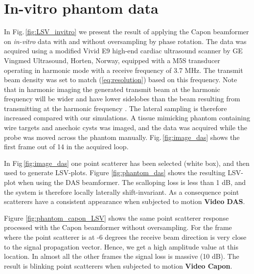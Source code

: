 \documentclass[journal]{IEEEtran}
\newcommand\multimedia[1]{\textbf{{\color{red}#1}}}
\begin{document}
\section{In-vitro phantom data}\label{sec:res}
In Fig.\,\ref{fig:LSV_invitro} we present the result of applying the Capon beamformer on \textit{in-vitro} data with and without oversampling by phase rotation. The data was acquired using a modified Vivid E9 high-end cardiac ultrasound scanner by GE Vingmed Ultrasound, Horten, Norway, equipped with a M5S transducer operating in harmonic mode with a receive frequency of 3.7 MHz. The transmit beam density was set to match (\ref{eq:resolution}) based on this frequency. Note that in harmonic imaging the generated transmit beam at the harmonic frequency will be wider and have lower sidelobes than the beam resulting from transmitting at the harmonic frequency \cite{Fedewa2004}. The lateral sampling is therefore increased compared with our simulations. A tissue mimicking phantom containing wire targets and anechoic cysts was imaged, and the data was acquired while the probe was moved across the phantom manually. Fig.\,\ref{fig:image_das} shows the first frame out of 14 in the acquired loop. %

In Fig\,\ref{fig:image_das} one point scatterer has been selected (white box), and then used to generate LSV-plots. Figure \ref{fig:phantom_das} shows the resulting LSV-plot when using the DAS beamformer. The scalloping loss is less than 1 dB, and the system is therefore locally laterally shift-invariant. As a consequence point scatterers have a consistent appearance when subjected to motion \multimedia{Video DAS}.  

Figure \ref{fig:phantom_capon_LSV} shows the same point scatterer response processed with the Capon beamformer without oversampling. For the frame where the point scatterer is at -6 degrees the receive beam direction is very close to the signal propagation vector. Hence, we get a high amplitude value at this location. In almost all the other frames the signal loss is massive (10 dB). The result is blinking point scatterers when subjected to motion \multimedia{Video Capon}. 
\end{document}
